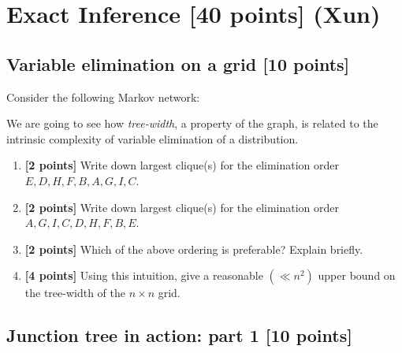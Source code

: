 \documentclass[12pt]{article}
\begin{document}
\newpage

\section{Exact Inference [40 points] (Xun)}

\subsection{Variable elimination on a grid [10 points]}

Consider the following Markov network:

\begin{figure}[h]
\centering
{}
\end{figure}


We are going to see how \emph{tree-width}, a property of the graph, is related to the intrinsic complexity of variable elimination of a distribution. 


\begin{enumerate}

\item \textbf{[2 points]} Write down largest clique(s) for the elimination order $ E, D, H, F, B, A, G, I, C $.



\item \textbf{[2 points]} Write down largest clique(s) for the elimination order $ A, G, I, C, D, H, F, B, E $. 



\item \textbf{[2 points]} Which of the above ordering is preferable? Explain briefly. 



\item \textbf{[4 points]} Using this intuition, give a reasonable $ (\ll n^2) $ upper bound on the tree-width of the $ n \times n $ grid. 



\end{enumerate}

\subsection{Junction tree in action: part 1 [10 points]}
\end{document}
